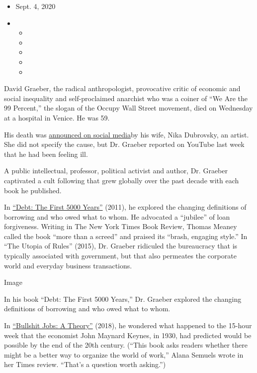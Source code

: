 \begin{itemize}
\item
  Sept. 4, 2020
\item
  \begin{itemize}
  \item
  \item
  \item
  \item
  \item
  \end{itemize}
\end{itemize}

David Graeber, the radical anthropologist, provocative critic of
economic and social inequality and self-proclaimed anarchist who was a
coiner of ``We Are the 99 Percent,'' the slogan of the Occupy Wall
Street movement, died on Wednesday at a hospital in Venice. He was 59.

His death was
\href{https://twitter.com/nikadubrovsky/status/1301504647769792512}{announced
on social media}by his wife, Nika Dubrovsky, an artist. She did not
specify the cause, but Dr. Graeber reported on YouTube last week that he
had been feeling ill.

A public intellectual, professor, political activist and author, Dr.
Graeber captivated a cult following that grew globally over the past
decade with each book he published.

In
\href{https://www.nytimes3xbfgragh.onion/2011/12/11/books/review/anarchist-anthropology.html}{``Debt:
The First 5000 Years''} (2011), he explored the changing definitions of
borrowing and who owed what to whom. He advocated a ``jubilee'' of loan
forgiveness. Writing in The New York Times Book Review, Thomas Meaney
called the book ``more than a screed'' and praised its ``brash, engaging
style.'' In ``The Utopia of Rules'' (2015), Dr. Graeber ridiculed the
bureaucracy that is typically associated with government, but that also
permeates the corporate world and everyday business transactions.

Image

In his book ``Debt: The First 5000 Years,'' Dr. Graeber explored the
changing definitions of borrowing and who owed what to whom.

In
\href{https://www.nytimes3xbfgragh.onion/2018/06/26/books/review/david-graeber-bullshit-jobs.html}{``Bullshit
Jobs: A Theory''} (2018), he wondered what happened to the 15-hour week
that the economist John Maynard Keynes, in 1930, had predicted would be
possible by the end of the 20th century. (``This book asks readers
whether there might be a better way to organize the world of work,''
Alana Semuels wrote in her Times review. ``That's a question worth
asking.'')

